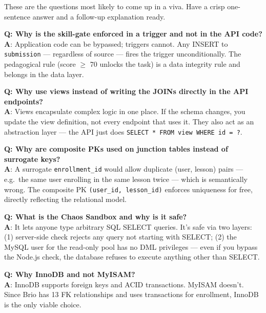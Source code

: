 \documentclass[11pt,a4paper]{article}
\newcommand{\T}[1]{\texttt{#1}}          %
\begin{document}
These are the questions most likely to come up in a viva. Have a crisp one-sentence
answer and a follow-up explanation ready.

\begin{qabox}
\textbf{Q: Why is the skill-gate enforced in a trigger and not in the API code?}\\
\textbf{A}: Application code can be bypassed; triggers cannot. Any INSERT to
\T{submission} — regardless of source — fires the trigger unconditionally. The
pedagogical rule (score $\geq$ 70 unlocks the task) is a data integrity rule and belongs
in the data layer.
\end{qabox}

\begin{qabox}
\textbf{Q: Why use views instead of writing the JOINs directly in the API endpoints?}\\
\textbf{A}: Views encapsulate complex logic in one place. If the schema changes, you
update the view definition, not every endpoint that uses it. They also act as an
abstraction layer — the API just does \T{SELECT * FROM view WHERE id = ?}.
\end{qabox}

\begin{qabox}
\textbf{Q: Why are composite PKs used on junction tables instead of surrogate keys?}\\
\textbf{A}: A surrogate \T{enrollment\_id} would allow duplicate (user, lesson) pairs —
e.g.\ the same user enrolling in the same lesson twice — which is semantically wrong.
The composite PK \T{(user\_id, lesson\_id)} enforces uniqueness for free, directly
reflecting the relational model.
\end{qabox}

\begin{qabox}
\textbf{Q: What is the Chaos Sandbox and why is it safe?}\\
\textbf{A}: It lets anyone type arbitrary SQL SELECT queries. It's safe via two layers:
(1) server-side check rejects any query not starting with SELECT; (2) the MySQL user
for the read-only pool has no DML privileges — even if you bypass the Node.js check,
the database refuses to execute anything other than SELECT.
\end{qabox}

\begin{qabox}
\textbf{Q: Why InnoDB and not MyISAM?}\\
\textbf{A}: InnoDB supports foreign keys and ACID transactions. MyISAM doesn't. Since
Brio has 13 FK relationships and uses transactions for enrollment, InnoDB is the only
viable choice.
\end{qabox}
\end{document}
